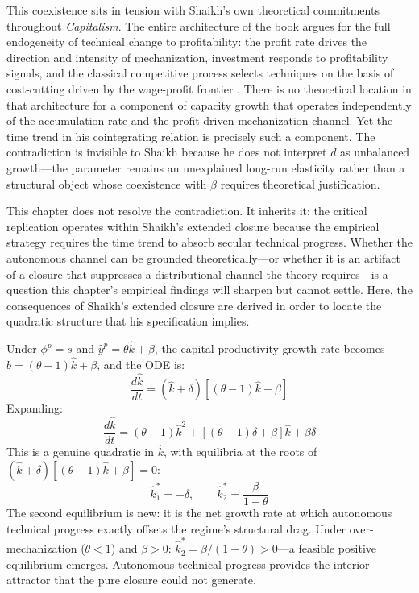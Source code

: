 \documentclass[11pt,a4paper]{article}
\begin{document}
This coexistence sits in tension with Shaikh's own theoretical commitments throughout \emph{Capitalism}. The entire architecture of the book argues for the full endogeneity of technical change to profitability: the profit rate drives the direction and intensity of mechanization, investment responds to profitability signals, and the classical competitive process selects techniques on the basis of cost-cutting driven by the wage-profit frontier \citep{Shaikh2016}. There is no theoretical location in that architecture for a component of capacity growth that operates independently of the accumulation rate and the profit-driven mechanization channel. Yet the time trend in his cointegrating relation is precisely such a component. The contradiction is invisible to Shaikh because he does not interpret $d$ as unbalanced growth---the parameter remains an unexplained long-run elasticity rather than a structural object whose coexistence with $\beta$ requires theoretical justification.

This chapter does not resolve the contradiction. It inherits it: the critical replication operates within Shaikh's extended closure because the empirical strategy requires the time trend to absorb secular technical progress. Whether the autonomous channel can be grounded theoretically---or whether it is an artifact of a closure that suppresses a distributional channel the theory requires---is a question this chapter's empirical findings will sharpen but cannot settle. Here, the consequences of Shaikh's extended closure are derived in order to locate the quadratic structure that his specification implies.

Under $\phi^p = s$ and $\hat{y}^p = \theta\hat{k} + \beta$, the capital productivity growth rate becomes $\hat{b} = (\theta - 1)\hat{k} + \beta$, and the ODE is:
%
\begin{equation}\label{eq:extended_ode}
	\frac{d\hat{k}}{dt} = (\hat{k} + \delta)\left[(\theta - 1)\hat{k} + \beta\right]
\end{equation}
%
Expanding:
%
\begin{equation}\label{eq:quadratic_expanded}
	\frac{d\hat{k}}{dt} = (\theta - 1)\hat{k}^2 + \left[(\theta - 1)\delta + \beta\right]\hat{k} + \beta\delta
\end{equation}
%
This is a genuine quadratic in $\hat{k}$, with equilibria at the roots of $(\hat{k} + \delta)[(\theta - 1)\hat{k} + \beta] = 0$:
%
\begin{equation}\label{eq:extended_equilibria}
	\hat{k}_1^* = -\delta, \qquad \hat{k}_2^* = \frac{\beta}{1 - \theta}
\end{equation}
%
The second equilibrium is new: it is the net growth rate at which autonomous technical progress exactly offsets the regime's structural drag. Under over-mechanization ($\theta < 1$) and $\beta > 0$: $\hat{k}_2^* = \beta/(1 - \theta) > 0$---a feasible positive equilibrium emerges. Autonomous technical progress provides the interior attractor that the pure closure could not generate.
\end{document}

